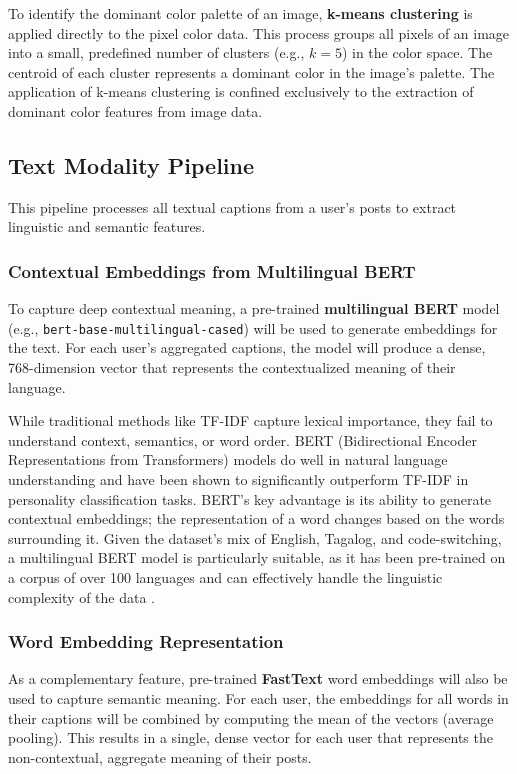To identify the dominant color palette of an image, \textbf{k-means clustering} is applied directly to the pixel color data. This process groups all pixels of an image into a small, predefined number of clusters (e.g., $k=5$) in the color space. The centroid of each cluster represents a dominant color in the image's palette. The application of k-means clustering is confined exclusively to the extraction of dominant color features from image data.

\subsection{Text Modality Pipeline}
This pipeline processes all textual captions from a user's posts to extract linguistic and semantic features.

\subsubsection{Contextual Embeddings from Multilingual BERT}
To capture deep contextual meaning, a pre-trained \textbf{multilingual BERT} model (e.g., \texttt{bert-base-multilingual-cased}) will be used to generate embeddings for the text. For each user's aggregated captions, the model will produce a dense, 768-dimension vector that represents the contextualized meaning of their language.

While traditional methods like TF-IDF capture lexical importance, they fail to understand context, semantics, or word order. BERT (Bidirectional Encoder Representations from Transformers) models do well in natural language understanding and have been shown to significantly outperform TF-IDF in personality classification tasks. BERT's key advantage is its ability to generate contextual embeddings; the representation of a word changes based on the words surrounding it. Given the dataset's mix of English, Tagalog, and code-switching, a multilingual BERT model is particularly suitable, as it has been pre-trained on a corpus of over 100 languages and can effectively handle the linguistic complexity of the data \citep{devlin2018bert, cruz2022roberta}.

\subsubsection{Word Embedding Representation}
As a complementary feature, pre-trained \textbf{FastText} word embeddings will also be used to capture semantic meaning. For each user, the embeddings for all words in their captions will be combined by computing the mean of the vectors (average pooling). This results in a single, dense vector for each user that represents the non-contextual, aggregate meaning of their posts.

